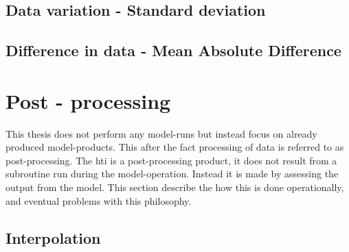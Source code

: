 \subsection{Data variation - Standard deviation}\label{sec:std}

\subsection{Difference in data - Mean Absolute Difference}\label{sec:mad}

\section{Post - processing}\label{sec:pp}
This thesis does not perform any model-runs but instead focus on already produced model-products. This after the fact processing of data is referred to as post-processing. The \acrshort{hti} is a post-processing product, it does not result from a subroutine run during the model-operation. Instead it is made by assessing the output from the model. This section describe the how this is done operationally, and eventual problems with this philosophy.

\subsection{Interpolation}\label{sec:interpolation}

